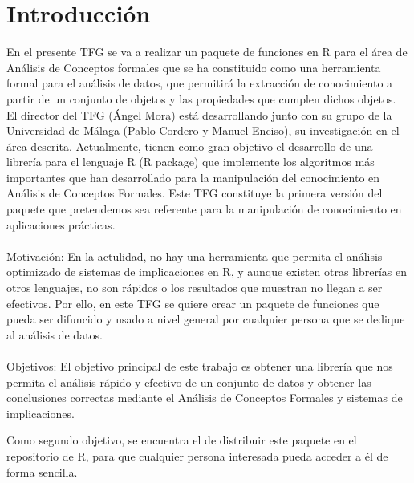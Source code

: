 \section{Introducci\'on}

En el presente TFG se va a realizar un paquete de funciones en 
R para el \'area de An\'alisis de Conceptos formales que se ha 
constituido como una herramienta formal para el an\'alisis de datos, 
que permitir\'a la extracci\'on de conocimiento a partir de un 
conjunto de objetos y las propiedades que cumplen dichos objetos.
\\
El director del TFG (\'Angel Mora) est\'a desarrollando junto 
con su grupo de la Universidad de M\'alaga (Pablo Cordero y Manuel 
Enciso), su investigaci\'on en el \'area descrita. Actualmente, 
tienen como gran objetivo el desarrollo de una librer\'ia para el 
lenguaje R (R package) que implemente los algoritmos m\'as 
importantes que han desarrollado para la manipulaci\'on del 
conocimiento en An\'alisis de Conceptos Formales. Este TFG 
constituye la primera versi\'on del paquete que pretendemos sea 
referente para la manipulaci\'on de conocimiento en aplicaciones 
pr\'acticas.
\\
\\
Motivaci\'on:
En la actulidad, no hay una herramienta que permita el an\'alisis 
optimizado de sistemas de implicaciones en R, y aunque existen otras 
librer\'ias en otros lenguajes, no son r\'apidos o los resultados que 
muestran no llegan a ser efectivos.
Por ello, en este TFG se quiere crear un paquete de funciones que pueda 
ser difuncido y usado a nivel general por cualquier persona que se dedique 
al an\'alisis de datos.
\\
\\
Objetivos:
El objetivo principal de este trabajo es obtener una librer\'ia que 
nos permita el an\'alisis r\'apido y efectivo de un conjunto de datos 
y obtener las conclusiones correctas mediante el An\'alisis de Conceptos 
Formales y sistemas de implicaciones.

Como segundo objetivo, se encuentra el de distribuir este paquete en el repositorio 
de R, para que cualquier persona interesada pueda acceder a \'el de forma sencilla.
\\
\\


\newpage
\thispagestyle{empty}
\mbox{}

\newpage